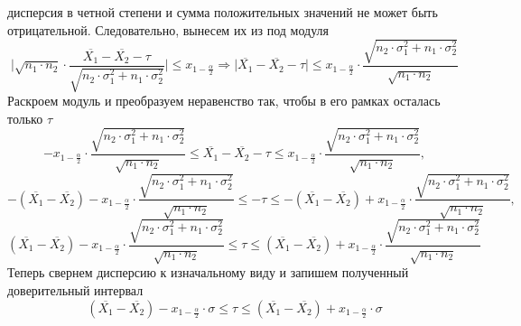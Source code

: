 \documentclass[a4paper, 12pt]{article}
\begin{document}
    дисперсия в четной степени и сумма положительных значений не может быть отрицательной. Следовательно, вынесем их из под модуля
    $$\Bigg|\sqrt{n_1\cdot n_2}\cdot\dfrac{\overline{X_1}-\overline{X_2}-\tau}{\sqrt{n_2\cdot\sigma_1^2+n_1\cdot\sigma_2^2}}\Bigg|\leq x_{1-\frac{\alpha}{2}}\Rightarrow
    \Bigg|\overline{X_1}-\overline{X_2}-\tau\Bigg|\leq x_{1-\frac{\alpha}{2}}\cdot\dfrac{\sqrt{n_2\cdot\sigma_1^2+n_1\cdot\sigma_2^2}}{\sqrt{n_1\cdot n_2}}$$
    Раскроем модуль и преобразуем неравенство так, чтобы в его рамках осталась только $\tau$
    $$-x_{1-\frac{\alpha}{2}}\cdot\dfrac{\sqrt{n_2\cdot\sigma_1^2+n_1\cdot\sigma_2^2}}{\sqrt{n_1\cdot n_2}}\leq\overline{X_1}-\overline{X_2}-\tau\leq x_{1-\frac{\alpha}{2}}\cdot\dfrac{\sqrt{n_2\cdot\sigma_1^2+n_1\cdot\sigma_2^2}}{\sqrt{n_1\cdot n_2}},$$
    $$-\left(\overline{X_1}-\overline{X_2}\right)-x_{1-\frac{\alpha}{2}}\cdot\dfrac{\sqrt{n_2\cdot\sigma_1^2+n_1\cdot\sigma_2^2}}{\sqrt{n_1\cdot n_2}}\leq-\tau\leq -\left(\overline{X_1}-\overline{X_2}\right)+x_{1-\frac{\alpha}{2}}\cdot\dfrac{\sqrt{n_2\cdot\sigma_1^2+n_1\cdot\sigma_2^2}}{\sqrt{n_1\cdot n_2}},$$
    $$\left(\overline{X_1}-\overline{X_2}\right)-x_{1-\frac{\alpha}{2}}\cdot\dfrac{\sqrt{n_2\cdot\sigma_1^2+n_1\cdot\sigma_2^2}}{\sqrt{n_1\cdot n_2}}\leq\tau\leq \left(\overline{X_1}-\overline{X_2}\right)+x_{1-\frac{\alpha}{2}}\cdot\dfrac{\sqrt{n_2\cdot\sigma_1^2+n_1\cdot\sigma_2^2}}{\sqrt{n_1\cdot n_2}}$$
    Теперь свернем дисперсию к изначальному виду и запишем полученный доверительный интервал
    $$\left(\overline{X_1}-\overline{X_2}\right)-x_{1-\frac{\alpha}{2}}\cdot\sigma\leq\tau\leq \left(\overline{X_1}-\overline{X_2}\right)+x_{1-\frac{\alpha}{2}}\cdot\sigma$$
\end{document}
